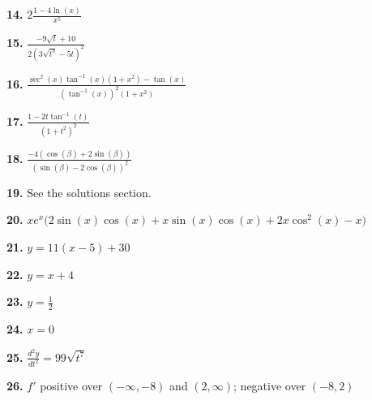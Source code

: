 \documentclass[12pt,]{book}
\theoremstyle{plain}
\theoremstyle{definition}
\numberwithin{equation}{section}
\newcommand{\fe}[2]{#1\mathopen{}\left(#2\right)\mathclose{}}
\newcommand{\ointerval}[2]{\left(#1,#2\right)}
\newcommand{\fd}[1]{#1'}
\newcommand{\lzn}[3]{\frac{d^{#1}#2}{d#3^{#1}}}
\begin{document}
                \par\smallskip
\noindent\textbf{14.}\quad{}
                    \(2\frac{1-4\fe{\ln}{x}}{x^5}\)%

                \par\smallskip
\noindent\textbf{15.}\quad{}
                    \(\frac{-9\sqrt{t}+10}{2\left(3\sqrt{t^3}-5t\right)^2}\)%

                \par\smallskip
\noindent\textbf{16.}\quad{}
                    \(\frac{\fe{\sec^2}{x}\fe{\tan^{-1}}{x}\left(1+x^2\right)-\fe{\tan}{x}}{\left(\fe{\tan^{-1}}{x}\right)^2\left(1+x^2\right)}\)%

                \par\smallskip
\noindent\textbf{17.}\quad{}
                    \(\frac{1-2t\fe{\tan^{-1}}{t}}{\left(1+t^2\right)^2}\)%

                \par\smallskip
\noindent\textbf{18.}\quad{}
                    \(\frac{-4\left(\fe{\cos}{\beta}+2\fe{\sin}{\beta}\right)}{\left(\fe{\sin}{\beta}-2\fe{\cos}{\beta}\right)^2}\)%

                \par\smallskip
\noindent\textbf{19.}\quad{}
                    See the solutions section.%

                \par\smallskip
\noindent\textbf{20.}\quad{}
                     \(xe^x\big(2\fe{\sin}{x}\fe{\cos}{x}+x\fe{\sin}{x}\fe{\cos}{x}+2x\fe{\cos^2}{x}-x\big)\)%

                \par\smallskip
\noindent\textbf{21.}\quad{}
                    \(y=11(x-5)+30\)%

                \par\smallskip
\noindent\textbf{22.}\quad{}
                    \(y=x+4\)%

                \par\smallskip
\noindent\textbf{23.}\quad{}
                    \(y=\frac{1}{2}\)%

                \par\smallskip
\noindent\textbf{24.}\quad{}
                    \(x=0\)%

                \par\smallskip
\noindent\textbf{25.}\quad{}
                \(\lzn{2}{y}{t}=99\sqrt{t^7}\)%

            \par\smallskip
\noindent\textbf{26.}\quad{}
                    \(\fd{f}\) positive over \(\ointerval{-\infty}{-8}\) and \(\ointerval{2}{\infty}\); negative over \(\ointerval{-8}{2}\)%
\end{document}
